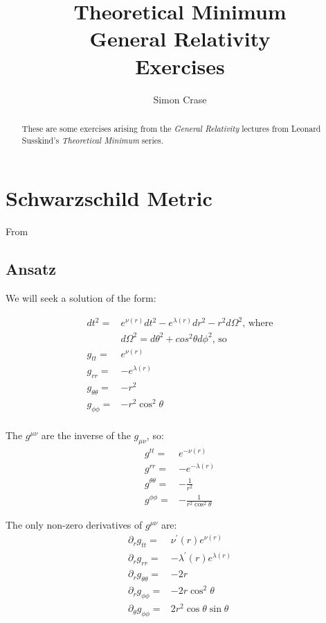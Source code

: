 \documentclass[]{article}
\title{Theoretical Minimum\\General Relativity\\Exercises}
\author{Simon Crase}
\begin{document}
\maketitle

\begin{abstract}
	These are some exercises arising from the \emph{General Relativity}\cite{susskind2012general} lectures from Leonard Susskind's \emph{Theoretical Minimum} series\cite{susskind2007theoretical}.
\end{abstract}

\tableofcontents
\listoffigures
\listoftables
\listoftheorems

	
\section{Schwarzschild Metric}

From \cite[Lecture 6]{susskind2012general}
\subsection{Ansatz}
We will seek a solution of the form\cite{Adler1965Introduction}:

\begin{align*}
	dt^2 =& e^{\nu(r)} dt^2 -e^{\lambda(r)} dr^2 -r^2 d \Omega^2 \text{, where}\\
	&d \Omega^2 =d\theta^2 + cos^2 \theta d\phi^2 \text{, so}\\
	g_{tt}=& e^{\nu(r)}\\
	g_{rr}=&-e^{\lambda(r)}\\
	g_{\theta\theta}=&-r^2\\
	g_{\phi\phi}=&-r^2 \cos^2 \theta\\
\end{align*}

The $g^{\mu\nu}$ are the inverse of the $g_{\mu\nu}$, so: 
\begin{align*}
g^{tt}=& e^{-\nu(r)}\\
	g^{rr}=&-e^{-\lambda(r)}\\
	g^{\theta\theta}=&-\frac{1}{r^2}\\
	g^{\phi\phi}=&-\frac{1}{r^2 \cos^2 \theta}
\end{align*}

The only non-zero derivatives of $g^{\mu\nu}$ are:
\begin{align*}
	\partial_r g_{tt}=& \nu^\prime(r) e^{\nu(r)}\\
	\partial_r g_{rr}=& -\lambda^\prime(r) e^{\lambda(r)}\\
	\partial_r g_{\theta\theta}=& -2 r\\
	\partial_r g_{\phi\phi}=& -2 r \cos^2 \theta\\
	\partial_\theta g_{\phi\phi}=& 2 r^2 \cos \theta \sin \theta
\end{align*}
\end{document}
